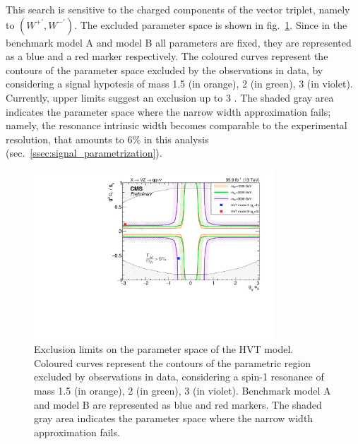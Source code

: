 \noindent This search is sensitive to the charged components of the vector triplet, namely to $(W^{+'}, W^{-'})$. The excluded parameter space is shown in fig.~\ref{fig:interpretation}. Since in the benchmark model A and model B all parameters are fixed, they are represented as a blue and a red marker respectively. The coloured curves represent the contours of the parameter space excluded by the observations in data, by considering a signal hypotesis of mass 1.5 \TeV (in orange), 2 \TeV (in green), 3 \TeV (in violet). Currently, upper limits suggest an exclusion up to 3 \TeV. The shaded gray area indicates the parameter space where the narrow width approximation fails; namely, the resonance intrinsic width becomes comparable to the experimental resolution, that amounts to 6\% in this analysis (sec.~\ref{ssec:signal_parametrization}).

\begin{figure}[!h]
 \begin{center}
   \includegraphics[width=0.8\textwidth]{v9/plotsAlpha/Limits/HVT_XVZ_Wprime.pdf}
   \caption{Exclusion limits on the parameter space of the HVT model. Coloured curves represent the contours of the parametric region excluded by observations in data, considering a spin-1 \Wp resonance of mass 1.5 \TeV (in orange), 2 \TeV (in green), 3 \TeV (in violet). Benchmark model A and model B are represented as blue and red markers. The shaded gray area indicates the parameter space where the narrow width approximation fails.}
   \label{fig:interpretation}
 \end{center}
\end{figure}

\clearpage

